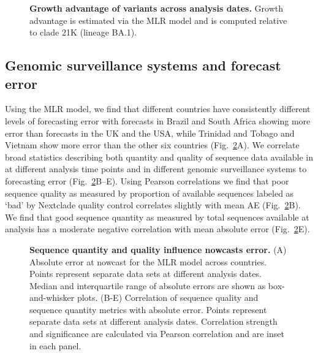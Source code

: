 \documentclass[10pt,letterpaper]{article}
\begin{document}


\begin{figure}[tb!]
	\centering
	\caption{
		\textbf{Growth advantage of variants across analysis dates.}
		Growth advantage is estimated via the MLR model and is computed relative to clade 21K (lineage BA.1).
	}
	\label{fig:Fig4}
\end{figure}





\subsection*{Genomic surveillance systems and forecast error}

Using the MLR model, we find that different countries have consistently different levels of forecasting error with forecasts in Brazil and South Africa showing more error than forecasts in the UK and the USA, while Trinidad and Tobago and Vietnam show more error than the other six countries (Fig.~\ref{fig:Fig5}A).
We correlate broad statistics describing both quantity and quality of sequence data available in at different analysis time points and in different genomic surveillance systems to forecasting error (Fig.~\ref{fig:Fig5}B--E).
Using Pearson correlations we find that poor sequence quality as measured by proportion of available sequences labeled as `bad' by Nextclade quality control \cite{aksamentov2021nextclade} correlates slightly with mean AE (Fig.~\ref{fig:Fig5}B).
We find that good sequence quantity as measured by total sequences available at analysis has a moderate negative correlation with mean absolute error (Fig.~\ref{fig:Fig5}E).

\begin{figure}[tb!]
	\centering
	\caption{
		\textbf{Sequence quantity and quality influence nowcasts error.}
    (A) Absolute error at nowcast for the MLR model across countries.
		Points represent separate data sets at different analysis dates.
		Median and interquartile range of absolute errors are shown as box-and-whisker plots.
		(B-E) Correlation of sequence quality and sequence quantity metrics with absolute error.
		Points represent separate data sets at different analysis dates.
    Correlation strength and significance are calculated via Pearson correlation and are inset in each panel.
	}
	\label{fig:Fig5}
\end{figure}
\end{document}
